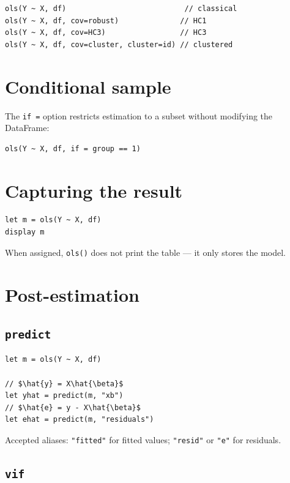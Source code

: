 \begin{lstlisting}[caption={Standard error variants}]
ols(Y ~ X, df)                           // classical
ols(Y ~ X, df, cov=robust)              // HC1
ols(Y ~ X, df, cov=HC3)                 // HC3
ols(Y ~ X, df, cov=cluster, cluster=id) // clustered
\end{lstlisting}

\section{Conditional sample}

The \lstinline{if =} option restricts estimation to a subset without modifying the DataFrame:

\begin{lstlisting}
ols(Y ~ X, df, if = group == 1)
\end{lstlisting}

\section{Capturing the result}

\begin{lstlisting}
let m = ols(Y ~ X, df)
display m
\end{lstlisting}

When assigned, \lstinline{ols()} does not print the table --- it only stores the model.

\section{Post-estimation}

\subsection{\texttt{predict}}

\begin{lstlisting}
let m = ols(Y ~ X, df)

// $\hat{y} = X\hat{\beta}$
let yhat = predict(m, "xb")
// $\hat{e} = y - X\hat{\beta}$
let ehat = predict(m, "residuals")
\end{lstlisting}

Accepted aliases: \texttt{"fitted"} for fitted values; \texttt{"resid"} or \texttt{"e"} for residuals.

\subsection{\texttt{vif}}

